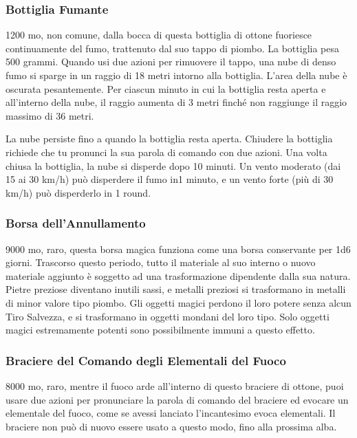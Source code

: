 \begin{multicols}{2}

\medskip

\subsubsection*{Bottiglia Fumante}
1200 mo, non comune, dalla bocca di questa bottiglia di ottone fuoriesce continuamente del fumo, trattenuto dal suo tappo di piombo. La bottiglia pesa 500 grammi. Quando usi due azioni per rimuovere il tappo, una nube di denso fumo si sparge in un raggio di 18 metri intorno alla bottiglia. L'area della nube è oscurata pesantemente. Per ciascun minuto in cui la bottiglia resta aperta e all'interno della nube, il raggio aumenta di 3 metri finché non raggiunge il raggio massimo di 36 metri.

La nube persiste fino a quando la bottiglia resta aperta. Chiudere la bottiglia richiede che tu pronunci la sua parola di comando con due azioni. Una volta chiusa la bottiglia, la nube si disperde dopo 10 minuti. Un vento moderato (dai 15 ai 30 km/h) può disperdere il fumo in1 minuto, e un vento forte (più di 30 km/h) può disperderlo in 1 round.

\subsubsection*{Borsa dell'Annullamento}
9000 mo, raro, questa borsa magica funziona come una borsa conservante per 1d6 giorni. Trascorso questo periodo, tutto il materiale al suo interno o nuovo materiale aggiunto è soggetto ad una trasformazione dipendente dalla sua natura. Pietre preziose diventano inutili sassi, e metalli preziosi si trasformano in metalli di minor valore tipo piombo. Gli oggetti magici perdono il loro potere senza alcun Tiro Salvezza, e si trasformano in oggetti mondani del loro tipo. Solo oggetti magici estremamente potenti sono possibilmente immuni a questo effetto.

\subsubsection*{Braciere del Comando degli Elementali del Fuoco}
8000 mo, raro, mentre il fuoco arde all'interno di questo braciere di ottone, puoi usare due azioni per pronunciare la parola di comando del braciere ed evocare un elementale del fuoco, come se avessi lanciato l'incantesimo evoca elementali. Il braciere non può di nuovo essere usato a questo modo, fino alla prossima alba.


\end{multicols}
